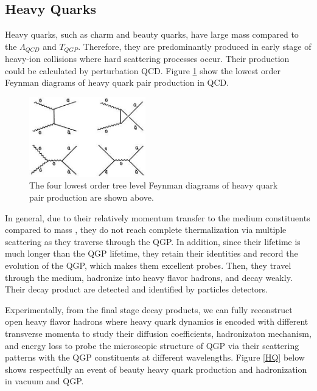 \subsection{Heavy Quarks}

Heavy quarks, such as charm and beauty quarks, have large mass compared to the $\Lambda_{QCD}$ and $T_{QGP}$. Therefore, they are predominantly produced in early stage of heavy-ion collisions where hard scattering processes occur. Their production could be calculated by perturbation QCD. Figure \ref{HQProduce} show the lowest order Feynman diagrams of heavy quark pair production in QCD. 

 \begin{figure}[hbtp]
\begin{center}
\includegraphics[width=0.45\textwidth]{Figures/Chapter1/HQDiagram.jpg}
\caption{The four lowest order tree level Feynman diagrams of heavy quark pair production are shown above.}
\label{HQProduce}
\end{center}
\end{figure}   

In general, due to their relatively momentum transfer to the medium constituents compared to mass \cite{}, they do not reach complete thermalization via multiple scattering as they traverse through the QGP. In addition, since their lifetime is much longer than the QGP lifetime, they retain their identities and record the evolution of the QGP, which makes them excellent probes. Then, they travel through the medium, hadronize into heavy flavor hadrons, and decay weakly. Their decay product are detected and identified by particles detectors.

Experimentally, from the final stage decay products, we can fully reconstruct open heavy flavor hadrons where heavy quark dynamics is encoded with different transverse momenta to study their diffusion coefficients, hadronizaton mechanism, and energy loss to probe the microscopic structure of QGP via their scattering patterns with the QGP constituents at different wavelengths. Figure \ref{HQ} below shows respectfully an event of beauty heavy quark production and hadronization in vacuum and QGP.

